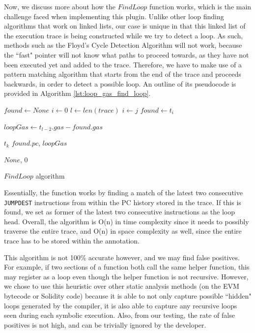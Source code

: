 Now, we discuss more about how the $\mathit{FindLoop}$ function works, which is
the main challenge faced when implementing this plugin. Unlike other loop finding
algorithms that work on linked lists, our case is unique in that this linked list of 
the execution trace is
being constructed while we try to detect a loop. As such, methods such as the Floyd's
Cycle Detection Algorithm will not work, because the ``fast" pointer will not know
what paths to proceed towards, as they have not been executed yet and added to the trace.
Therefore, we have to make use of a pattern matching algorithm that starts from the end of the trace 
and proceeds backwards, in order to detect a possible loop.
An outline of its
pseudocode is provided in Algorithm \ref{lst:loop_gas_find_loop}. 

\begin{algorithm}[H]
\DontPrintSemicolon
  

  $found\gets None$\;
  $i\gets 0$\;
  $l\gets len(trace)$\;
  {
    $i\gets j$\;
    {
      $found\gets t_i$\;
      \Break
    }
  }

    {
      $loopGas\gets t_{l-2}.gas - found.gas$\;
      
      {
        \Delete $t_k$
      }
      \Return $found.pc$, $loopGas$
    }
  \Else
  {
    \Return $None$, $0$
  }
  \caption{$FindLoop$ algorithm}
  \label{lst:loop_gas_find_loop}
\end{algorithm}


Essentially, the
function works by finding a match of the latest two consecutive \texttt{JUMPDEST} instructions
from within the PC history stored in the trace. If this is found, we set as former of the latest
two consecutive instructions as the loop head. Overall, the algorithm is O(n) in time complexity
since it needs to possibly traverse the entire trace, and O(n) in space complexity as well, since
the entire trace has to be stored within the annotation.

This algorithm is not 100\% accurate however,
and we may find false positives. For example, if two sections of a function both call the same
helper function, this may register as a loop even though the helper function is not recursive.
However, we chose to use this heuristic over other static analysis methods (on the EVM bytecode
or Solidity code) because it is able to not only capture possible ``hidden" loops generated
by the compiler, it is also able to capture any recursive loops seen during each symbolic execution.
Also, from our testing, the rate of false positives is not high, and can be trivially ignored 
by the developer.

